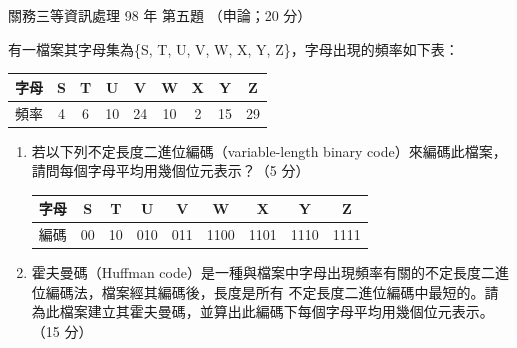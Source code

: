 \begin{pastexam}[label={px:gw3-098-ds-05}]{關務三等資訊處理 98 年 第五題}
（申論；20 分）

有一檔案其字母集為\{S, T, U, V, W, X, Y, Z\}，字母出現的頻率如下表：
\begin{center}
\small
\begin{tabular}{|c|c|c|c|c|c|c|c|c|}
\hline
字母 & S & T & U & V & W & X & Y & Z \\ \hline
頻率 & 4 & 6 & 10 & 24 & 10 & 2 & 15 & 29 \\ \hline
\end{tabular}
\end{center}
\begin{enumerate}[leftmargin=2.6em, labelsep=0.4em]
\item[㈠] 若以下列不定長度二進位編碼（variable-length binary code）來編碼此檔案，請問每個字母平均用幾個位元表示？（5 分）
\begin{center}
\small
\begin{tabular}{|c|c|c|c|c|c|c|c|c|}
\hline
字母 & S & T & U & V & W & X & Y & Z \\ \hline
編碼 & 00 & 10 & 010 & 011 & 1100 & 1101 & 1110 & 1111 \\ \hline
\end{tabular}
\end{center}
\item[㈡] 霍夫曼碼（Huffman code）是一種與檔案中字母出現頻率有關的不定長度二進位編碼法，檔案經其編碼後，長度是所有
不定長度二進位編碼中最短的。請為此檔案建立其霍夫曼碼，並算出此編碼下每個字母平均用幾個位元表示。（15 分）
\end{enumerate}
\end{pastexam}

